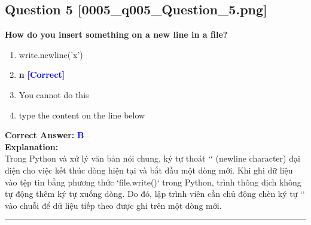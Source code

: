 \documentclass[11pt,a4paper]{article}
\begin{document}
\begin{minipage}{\textwidth}
\subsection*{Question 5 \quad \footnotesize{[0005_q005_Question_5.png]}}
\noindent \textbf{How do you insert something on a new line in a file?}

\begin{enumerate}[label=\Alph*.]
    \item write.newline('x')
    \item \textbf{n} \hfill \textcolor{blue}{\textbf{[Correct]}}
    \item You cannot do this
    \item type the content on the line below
\end{enumerate}

\noindent \textbf{Correct Answer:} \textcolor{blue}{\textbf{B}} \\[4pt]
\noindent \textbf{Explanation:}\\
Trong Python và xử lý văn bản nói chung, ký tự thoát `\n` (newline character) đại diện cho việc kết thúc dòng hiện tại và bắt đầu một dòng mới.\newline
Khi ghi dữ liệu vào tệp tin bằng phương thức `file.write()` trong Python, trình thông dịch không tự động thêm ký tự xuống dòng. Do đó, lập trình viên cần chủ động chèn ký tự `\n` vào chuỗi để dữ liệu tiếp theo được ghi trên một dòng mới.
\end{minipage}
\vspace{0.8cm}
\hrule
\vspace{0.5cm}
\end{document}
